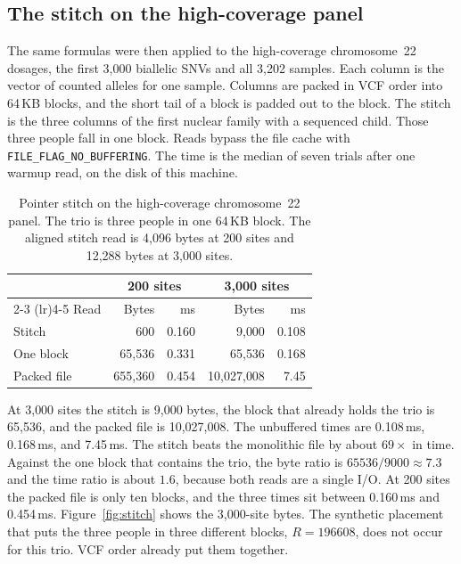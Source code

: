 \documentclass[11pt]{article}
\begin{document}
\subsection{The stitch on the high-coverage panel}
\label{sec:stitch-real}

The same formulas were then applied to the high-coverage chromosome~22 dosages, the first 3{,}000 biallelic SNVs and all 3{,}202 samples.
Each column is the vector of counted alleles for one sample.
Columns are packed in VCF order into 64\,KB blocks, and the short tail of a block is padded out to the block.
The stitch is the three columns of the first nuclear family with a sequenced child.
Those three people fall in one block.
Reads bypass the file cache with \texttt{FILE\_FLAG\_NO\_BUFFERING}.
The time is the median of seven trials after one warmup read, on the disk of this machine.

\begin{table}[t]
  \centering
  \caption{Pointer stitch on the high-coverage chromosome~22 panel.
  The trio is three people in one 64\,KB block.
  The aligned stitch read is 4{,}096 bytes at 200 sites and 12{,}288 bytes at 3{,}000 sites.}
  \label{tab:stitch}
  \small
  \setlength{\tabcolsep}{4pt}
  \begin{tabular}{@{}lrrrr@{}}
    \toprule
    & \multicolumn{2}{c}{200 sites} & \multicolumn{2}{c}{3{,}000 sites} \\
    \cmidrule(lr){2-3} \cmidrule(lr){4-5}
    Read & Bytes & ms & Bytes & ms \\
    \midrule
    Stitch & 600 & 0.160 & 9{,}000 & 0.108 \\
    One block & 65{,}536 & 0.331 & 65{,}536 & 0.168 \\
    Packed file & 655{,}360 & 0.454 & 10{,}027{,}008 & 7.45 \\
    \bottomrule
  \end{tabular}
\end{table}

At 3{,}000 sites the stitch is 9{,}000 bytes, the block that already holds the trio is 65{,}536, and the packed file is 10{,}027{,}008.
The unbuffered times are 0.108\,ms, 0.168\,ms, and 7.45\,ms.
The stitch beats the monolithic file by about \(69\times\) in time.
Against the one block that contains the trio, the byte ratio is \(65536/9000 \approx 7.3\) and the time ratio is about \(1.6\), because both reads are a single I/O.
At 200 sites the packed file is only ten blocks, and the three times sit between 0.160\,ms and 0.454\,ms.
Figure~\ref{fig:stitch} shows the 3{,}000-site bytes.
The synthetic placement that puts the three people in three different blocks, \(R = 196608\), does not occur for this trio.
VCF order already put them together.
\end{document}
